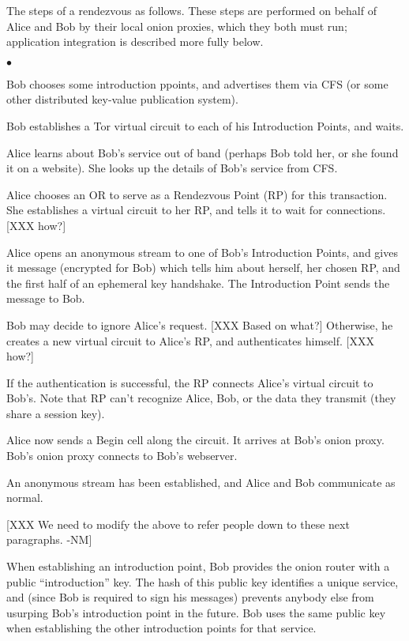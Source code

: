 \documentclass[times,10pt,twocolumn]{article}
\newenvironment{tightlist}{\begin{list}{$\bullet$}{
  \setlength{\itemsep}{0mm}
    \setlength{\parsep}{0mm}
    }}{\end{list}}
\begin{document}
The steps of a rendezvous as follows.  These steps are performed on
behalf of Alice and Bob by their local onion proxies, which they both
must run; application integration is described more fully below.
\begin{tightlist}
\item Bob chooses some introduction ppoints, and advertises them via
      CFS (or some other distributed key-value publication system).
\item Bob establishes a Tor virtual circuit to each of his
      Introduction Points, and waits.
\item Alice learns about Bob's service out of band (perhaps Bob told her,
      or she found it on a website). She looks up the details of Bob's
      service from CFS.
\item Alice chooses an OR to serve as a Rendezvous Point (RP) for this
      transaction. She establishes a virtual circuit to her RP, and
      tells it to wait for connections. [XXX how?]
\item Alice opens an anonymous stream to one of Bob's Introduction
      Points, and gives it message (encrypted for Bob) which tells him
      about herself, her chosen RP, and the first half of an ephemeral
      key handshake. The Introduction Point sends the message to Bob.
\item Bob may decide to ignore Alice's request.  [XXX Based on what?]
      Otherwise, he creates a new virtual circuit to Alice's RP, and
      authenticates himself. [XXX how?]
\item If the authentication is successful, the RP connects Alice's
      virtual circuit to Bob's. Note that RP can't recognize Alice,
      Bob, or the data they transmit (they share a session key).
\item Alice now sends a Begin cell along the circuit. It arrives at Bob's
      onion proxy. Bob's onion proxy connects to Bob's webserver.
\item An anonymous stream has been established, and Alice and Bob
      communicate as normal.
\end{tightlist}

[XXX We need to modify the above to refer people down to these next
  paragraphs. -NM]

When establishing an introduction point, Bob provides the onion router
with a public ``introduction'' key.  The hash of this public key
identifies a unique service, and (since Bob is required to sign his
messages) prevents anybody else from usurping Bob's introduction point
in the future. Bob uses the same public key when establishing the other
introduction points for that service.
\end{document}
